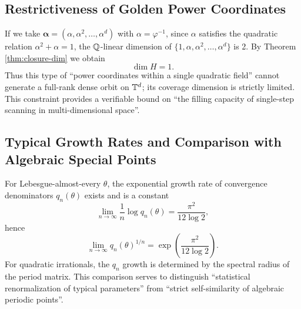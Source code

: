\subsection{Restrictiveness of Golden Power Coordinates}

If we take $\boldsymbol{\alpha}=(\alpha,\alpha^2,\dots,\alpha^d)$ with $\alpha=\varphi^{-1}$, since $\alpha$ satisfies the quadratic relation $\alpha^2+\alpha=1$, the $\mathbb{Q}$-linear dimension of $\{1,\alpha,\alpha^2,\dots,\alpha^d\}$ is 2. By Theorem \ref{thm:closure-dim} we obtain
\[
\dim H=1.
\]
Thus this type of ``power coordinates within a single quadratic field'' cannot generate a full-rank dense orbit on $\mathbb{T}^d$; its coverage dimension is strictly limited. This constraint provides a verifiable bound on ``the filling capacity of single-step scanning in multi-dimensional space''.

\subsection{Typical Growth Rates and Comparison with Algebraic Special Points}

For Lebesgue-almost-every $\theta$, the exponential growth rate of convergence denominators $q_n(\theta)$ exists and is a constant
\[
\lim_{n\to\infty}\frac{1}{n}\log q_n(\theta)=\frac{\pi^2}{12\log 2},
\]
hence
\[
\lim_{n\to\infty} q_n(\theta)^{1/n}=\exp\!\left(\frac{\pi^2}{12\log 2}\right).
\]
For quadratic irrationals, the $q_n$ growth is determined by the spectral radius of the period matrix. This comparison serves to distinguish ``statistical renormalization of typical parameters'' from ``strict self-similarity of algebraic periodic points''.
